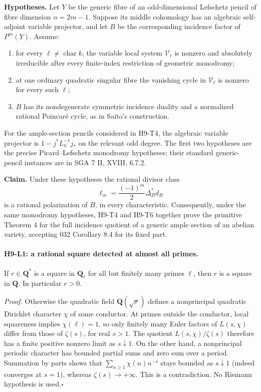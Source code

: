 \documentclass[11pt,a4paper]{article}
\begin{document}
\textbf{Hypotheses.} Let $Y$ be the generic fibre of an odd-dimensional
Lefschetz pencil of fibre dimension $n=2m-1$. Suppose its middle
cohomology has an algebraic self-adjoint variable projector, and let
$B$ be the corresponding incidence factor of $P^m(Y)$. Assume:
\begin{enumerate}
\item for every $\ell\ne\operatorname{char}k$, the variable local system
      $\mathcal V_\ell$ is nonzero and absolutely irreducible after every
      finite-index restriction of geometric monodromy;
\item at one ordinary quadratic singular fibre the vanishing cycle in
      $\mathcal V_\ell$ is nonzero for every such $\ell$;
\item $B$ has its nondegenerate symmetric incidence duality and a
      normalized rational Poincar\'e cycle, as in Saito's construction.
\end{enumerate}
For the ample-section pencils considered in H9-T4, the algebraic variable
projector is $1-j^*L_h^{-1}j_*$ on the relevant odd degree. The first two
hypotheses are the precise Picard--Lefschetz monodromy hypotheses; their
standard generic-pencil instances are in SGA 7 II, XVIII, 6.7.2.

\textbf{Claim.} Under these hypotheses the rational divisor class
\[
 \ell_m=\frac{(-1)^m}{2}\Delta_B^*d_B
\]
is a rational polarization of $B$, in every characteristic. Consequently,
under the same monodromy hypotheses, H9-T4 and H9-T6 together prove the
primitive Theorem 4 for the full incidence quotient of a generic ample
section of an abelian variety, accepting 032 Corollary 8.4 for its fixed
part.

\paragraph{H9-L1: a rational square detected at almost all primes.}
If $r\in\mathbf Q^*$ is a square in $\mathbf Q_\ell$ for all but
finitely many primes $\ell$, then $r$ is a square in $\mathbf Q$.
In particular $r>0$.

\emph{Proof.} Otherwise the quadratic field $\mathbf Q(\sqrt r)$
defines a nonprincipal quadratic Dirichlet character $\chi$ of some
conductor. At primes outside the conductor, local squareness implies
$\chi(\ell)=1$, so only finitely many Euler factors of $L(s,\chi)$
differ from those of $\zeta(s)$, for real $s>1$. The quotient
$L(s,\chi)/\zeta(s)$ therefore has a finite positive nonzero limit as
$s\downarrow1$. On the other hand, a nonprincipal periodic character
has bounded partial sums and zero sum over a period. Summation by parts
shows that $\sum_{n\ge1}\chi(n)n^{-s}$ stays bounded as $s\downarrow1$
(indeed converges at $s=1$), whereas $\zeta(s)\to+\infty$.
This is a contradiction. No Riemann hypothesis is used.\hfill$\square$
\end{document}
